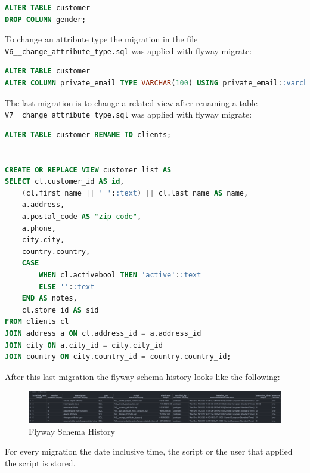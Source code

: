 %

\begin{lstlisting}[language=SQL]
ALTER TABLE customer
DROP COLUMN gender;
\end{lstlisting}

%
To change an attribute type the migration in the file \texttt{V6\_\_change\_attribute\_type.sql} was applied with flyway migrate:
\begin{lstlisting}[language=SQL]
ALTER TABLE customer
ALTER COLUMN private_email TYPE VARCHAR(100) USING private_email::varchar;
\end{lstlisting}


%
The last migration is to change a related view after renaming a table\\
\texttt{V7\_\_change\_attribute\_type.sql} was applied with flyway migrate:
\begin{lstlisting}[language=SQL]
ALTER TABLE customer RENAME TO clients;
	
	
CREATE OR REPLACE VIEW customer_list AS
SELECT cl.customer_id AS id,
	(cl.first_name || ' '::text) || cl.last_name AS name,
	a.address,
	a.postal_code AS "zip code",
	a.phone,
	city.city,
	country.country,
	CASE
		WHEN cl.activebool THEN 'active'::text
		ELSE ''::text
	END AS notes,
	cl.store_id AS sid
FROM clients cl
JOIN address a ON cl.address_id = a.address_id
JOIN city ON a.city_id = city.city_id
JOIN country ON city.country_id = country.country_id;
\end{lstlisting}

After this last migration the flyway schema history looks like the following:
\begin{figure}[H]
	\centering
	\includegraphics[width=1.1\textwidth]{./chapters/scenarios/images/flyway_schema_history}
	\caption[Flyway Schema History - Source: Own illustration]{Flyway Schema History}
\end{figure}
For every migration the date inclusive time, the script or the user that applied the script is stored.


